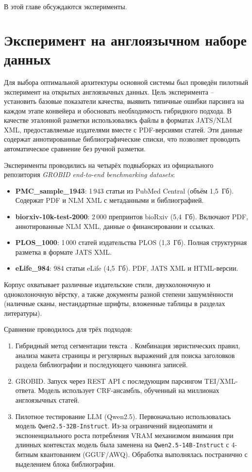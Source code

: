 В этой главе обсуждаются эксперименты.

\section{Эксперимент на англоязычном наборе данных}
Для выбора оптимальной архитектуры основной системы был проведён пилотный эксперимент на открытых англоязычных данных. Цель эксперимента -- установить базовые показатели качества, выявить типичные ошибки парсинга на каждом этапе конвейера и обосновать необходимость гибридного подхода. В качестве эталонной разметки использовались файлы в форматах JATS/NLM XML, предоставляемые издателями вместе с PDF-версиями статей. Эти данные содержат аннотированные библиографические списки, что позволяет проводить автоматическое сравнение без ручной разметки.

Эксперименты проводились на четырёх подвыборках из официального репозитория \textit{GROBID end-to-end benchmarking datasets}:
\begin{itemize}
    \item \textbf{PMC\_sample\_1943}: 1\,943 статьи из PubMed Central (объём 1,5~Гб). Содержат PDF и NLM XML с метаданными и библиографией.
    \item \textbf{biorxiv-10k-test-2000}: 2\,000 препринтов bioRxiv (5,4~Гб). Включают PDF, аннотированные NLM XML, данные о финансировании и ссылках.
    \item \textbf{PLOS\_1000}: 1\,000 статей издательства PLOS (1,3~Гб). Полная структурная разметка в формате JATS XML.
    \item \textbf{eLife\_984}: 984 статьи eLife (4,5~Гб). PDF, JATS XML и HTML-версии.
\end{itemize}
Корпус охватывает различные издательские стили, двухколоночную и одноколоночную вёрстку, а также документы разной степени зашумлённости (наличные сканы, нестандартные шрифты, вложенные таблицы в разделах литературы).

Сравнение проводилось для трёх подходов:
\begin{enumerate}
    \item Гибридный метод сегментации текста~\cite{kopanichuk2025structure}. Комбинация эвристических правил, анализа макета страницы и регулярных выражений для поиска заголовков раздела библиографии и последующего чанкинга записей.
    \item GROBID. Запуск через REST API с последующим парсингом TEI/XML-ответа. Модель использует CRF-ансамбль, обученный на миллионах англоязычных статей.
    \item Пилотное тестирование LLM (Qwen2.5). Первоначально использовалась модель \texttt{Qwen2.5-32B-Instruct}. Из-за ограничений видеопамяти и экспоненциального роста потребления VRAM механизмом внимания при длинных контекстах модель была заменена на \texttt{Qwen2.5-14B-Instruct} с 4-битным квантованием (GGUF/AWQ). Обработка выполнялась постранично с выделением блока библиографии.
\end{enumerate}

